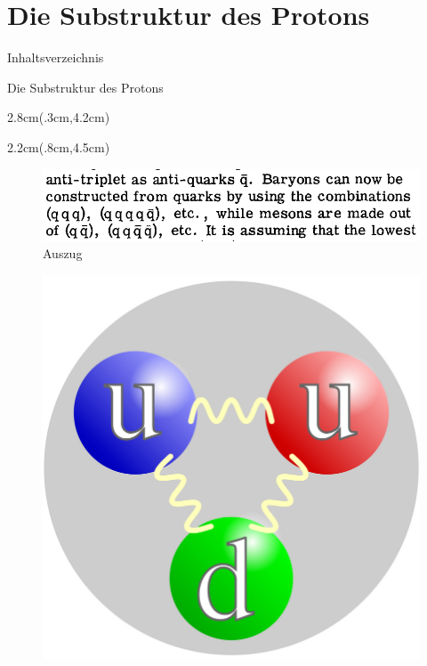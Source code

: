 \documentclass[t,9pt]{beamer}
\newcommand{\highlight}[3]{ \begin{textblock*}{#1}(#2,#3) \begin{tcolorbox} [enhanced,opacityfill=.1,colback=blue] \end{tcolorbox} \end{textblock*} } %
\begin{document}
        \section{Die Substruktur des Protons}

        \begin{frame}{Inhaltsverzeichnis}
                \tableofcontents[currentsection]
        \end{frame}

        \begin{frame}{Die Substruktur des Protons}
                \begin{minipage}{.7\textwidth}
                \highlight{2.8cm}{.3cm}{4.2cm}
                \highlight{2.2cm}{.8cm}{4.5cm}
                \begin{figure}
                        \includegraphics[width=\textwidth]{prosi_gell_mann_quarks_short.png}
                        \caption*{Auszug \cite{Gellmann1964}}
                \end{figure}
                \end{minipage}
                \begin{minipage}{.25\textwidth}
                        \begin{figure}
                                \centering
                                \includegraphics[width=.8\textwidth]{prosi_quark_proton.png}

\end{figure}
\end{minipage}
\end{frame}
\end{document}
